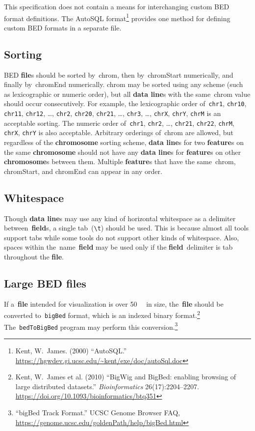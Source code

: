 \documentclass[11pt]{article}
\providecommand*{\Ac}[1]{\ac{#1}} %
\begin{document}
This specification does not contain a means for interchanging custom \ac{BED} format definitions.
The AutoSQL format\footnote{Kent, W.~James.
  (2000) ``AutoSQL.''
  \url{https://hgwdev.gi.ucsc.edu/~kent/exe/doc/autoSql.doc}} provides one method for defining custom \ac{BED} formats in a separate file.

\subsection{Sorting}
\Ac{BED} \textbf{file}s should be sorted by~\textsf{chrom}, then by~\textsf{chromStart} numerically, and finally by~\textsf{chromEnd} numerically.
\textsf{chrom} may be sorted using any scheme (such as lexicographic or numeric order), but all \textbf{data line}s with the same~\textsf{chrom} value should occur consecutively.
For example, the lexicographic order of~\texttt{chr1}, \texttt{chr10}, \texttt{chr11}, \texttt{chr12}, {\ldots}, \texttt{chr2}, \texttt{chr20}, \texttt{chr21}, {\ldots}, \texttt{chr3}, {\ldots}, \texttt{chrX}, \texttt{chrY}, \texttt{chrM} is an acceptable sorting.
The numeric order of~\texttt{chr1}, \texttt{chr2}, {\ldots}, \texttt{chr21}, \texttt{chr22}, \texttt{chrM}, \texttt{chrX}, \texttt{chrY} is also acceptable.
Arbitrary orderings of~\textsf{chrom} are allowed, but regardless of the \textbf{chromosome} sorting scheme, \textbf{data line}s for two \textbf{feature}s on the same \textbf{chromosome} should not have any \textbf{data line}s for \textbf{feature}s on other \textbf{chromosome}s between them.
Multiple \textbf{feature}s that have the same~\textsf{chrom}, \textsf{chromStart}, and \textsf{chromEnd} can appear in any order.

\subsection{Whitespace}\label{sec:whitespace}
Though \textbf{data line}s may use any kind of horizontal whitespace as a delimiter between~\textbf{field}s, a single tab~(\texttt{{\textbackslash}t}) should be used.
This is because almost all tools support tabs while some tools do not support other kinds of whitespace.
Also, spaces within the~\textsf{name}~\textbf{field} may be used only if the \textbf{field}~delimiter is tab throughout the \textbf{file}.

\subsection{Large \acs{BED} files}
If a~\textbf{file} intended for visualization is over \SI{50}{\mebi\byte} in size, the~\textbf{file} should be converted to~\texttt{bigBed} format, which is an indexed binary format.\footnote{Kent, W.~James et al.
  (2010) ``BigWig and BigBed: enabling browsing of large distributed datasets.''
  \emph{Bioinformatics} 26(17):2204--2207.
  \url{https://doi.org/10.1093/bioinformatics/btq351}}
The~\texttt{bedToBigBed} program may perform this conversion.\footnote{``bigBed Track Format.''
  \Ac{UCSC} Genome Browser FAQ, \url{https://genome.ucsc.edu/goldenPath/help/bigBed.html}}
\end{document}
